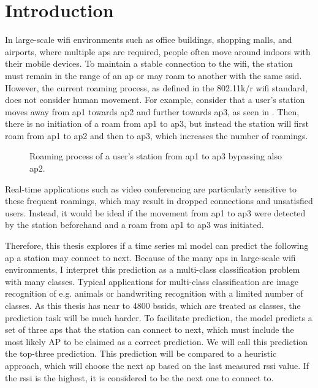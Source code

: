 \chapter{Introduction}\label{ch:intro}

In large-scale \ac{wifi} environments such as office buildings, shopping malls, and airports, where multiple \acp{ap} are required, people often move around indoors with their mobile devices.
To maintain a stable connection to the \ac{wifi}, the station must remain in the range of an \ac{ap} or may roam to another with the same \ac{ssid}.
However, the current roaming process, as defined in the 802.11k/r\cite{802.11k}\cite{802.11r} \ac{wifi} standard, does not consider human movement.
For example, consider that a user's station moves away from \ac{ap}1 towards \ac{ap}2 and further towards \ac{ap}3, as seen in .
Then, there is no initiation of a roam from \ac{ap}1 to \ac{ap}3, but instead the station will first roam from \ac{ap}1 to \ac{ap}2 and then to \ac{ap}3, which increases the number of roamings.

\begin{figure}[h]
    \centering
    
    \caption{Roaming process of a user's station from \ac{ap}1 to \ac{ap}3 bypassing also \ac{ap}2.}
    \label{fig:roaming}
\end{figure}

Real-time applications such as video conferencing are particularly sensitive to these frequent roamings, which may result in dropped connections and unsatisfied users.
Instead, it would be ideal if the movement from \ac{ap}1 to \ac{ap}3 were detected by the station beforehand and a roam from \ac{ap}1 to \ac{ap}3 was initiated.

Therefore, this thesis explores if a time series \ac{ml} model can predict the following \ac{ap} a station may connect to next.
Because of the many \acp{ap} in large-scale \ac{wifi} environments, I interpret this prediction as a multi-class classification problem with many classes.
Typical applications for multi-class classification are image recognition of e.g. animals or handwriting recognition with a limited number of classes.
As this thesis has near to 4800 \acp{bssid}, which are treated as classes, the prediction task will be much harder.
To facilitate prediction, the model predicts a set of three \acp{ap} that the station can connect to next, which must include the most likely AP to be claimed as a correct prediction.
We will call this prediction the top-three prediction.
This prediction will be compared to a heuristic approach, which will choose the next \ac{ap} based on the last measured \ac{rssi} value.
If the \ac{rssi} is the highest, it is considered to be the next one to connect to.

